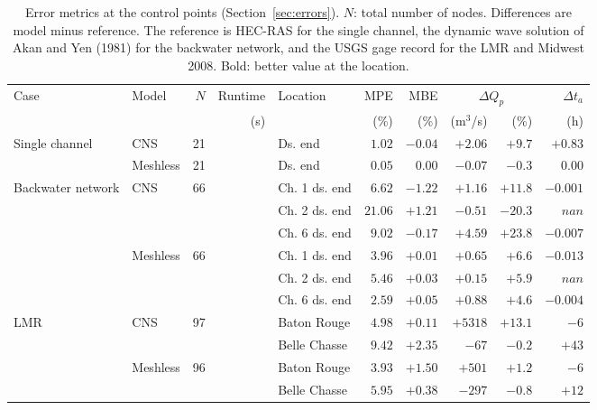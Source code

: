 \begin{table}[htbp]
\caption{Error metrics at the control points (Section~\ref{sec:errors}). $N$: total number of nodes. Differences are model minus reference. The reference is HEC-RAS for the single channel, the dynamic wave solution of Akan and Yen (1981) for the backwater network, and the USGS gage record for the LMR and Midwest 2008. Bold: better value at the location.}
\label{tab:error-summary}
\centering
\small
\setlength{\tabcolsep}{4pt}
\begin{tabular}{llrrlrrrrr}
\toprule
Case & Model & $N$ & Runtime & Location & MPE & MBE & \multicolumn{2}{c}{$\Delta Q_p$} & $\Delta t_a$ \\
\cmidrule(lr){8-9}
 & & & (s) & & (\%) & (\%) & (m$^3$/s) & (\%) & (h) \\
\midrule
Single channel & CNS & 21 &  & Ds. end & $1.02$ & $-0.04$ & $+2.06$ & $+9.7$ & $+0.83$ \\
\cmidrule(l){2-10}
 & Meshless & 21 &  & Ds. end & \boldmath$0.05$ & \boldmath$0.00$ & \boldmath$-0.07$ & \boldmath$-0.3$ & \boldmath$0.00$ \\
\midrule
Backwater network & CNS & 66 &  & Ch. 1 ds. end & $6.62$ & $-1.22$ & $+1.16$ & $+11.8$ & \boldmath$-0.001$ \\
 &  &  &  & Ch. 2 ds. end & $21.06$ & $+1.21$ & $-0.51$ & $-20.3$ & \boldmath$nan$ \\
 &  &  &  & Ch. 6 ds. end & $9.02$ & $-0.17$ & $+4.59$ & $+23.8$ & $-0.007$ \\
\cmidrule(l){2-10}
 & Meshless & 66 &  & Ch. 1 ds. end & \boldmath$3.96$ & \boldmath$+0.01$ & \boldmath$+0.65$ & \boldmath$+6.6$ & $-0.013$ \\
 &  &  &  & Ch. 2 ds. end & \boldmath$5.46$ & \boldmath$+0.03$ & \boldmath$+0.15$ & \boldmath$+5.9$ & $nan$ \\
 &  &  &  & Ch. 6 ds. end & \boldmath$2.59$ & \boldmath$+0.05$ & \boldmath$+0.88$ & \boldmath$+4.6$ & \boldmath$-0.004$ \\
\midrule
LMR & CNS & 97 &  & Baton Rouge & $4.98$ & \boldmath$+0.11$ & $+5318$ & $+13.1$ & \boldmath$-6$ \\
 &  &  &  & Belle Chasse & $9.42$ & $+2.35$ & \boldmath$-67$ & \boldmath$-0.2$ & $+43$ \\
\cmidrule(l){2-10}
 & Meshless & 96 &  & Baton Rouge & \boldmath$3.93$ & $+1.50$ & \boldmath$+501$ & \boldmath$+1.2$ & $-6$ \\
 &  &  &  & Belle Chasse & \boldmath$5.95$ & \boldmath$+0.38$ & $-297$ & $-0.8$ & \boldmath$+12$ \\

\end{tabular}
\end{table}
